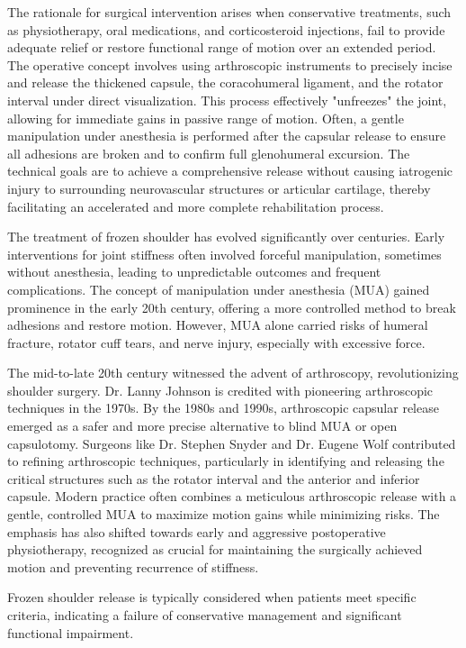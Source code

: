 The rationale for surgical intervention arises when conservative treatments, such as physiotherapy, oral medications, and corticosteroid injections, fail to provide adequate relief or restore functional range of motion over an extended period. The operative concept involves using arthroscopic instruments to precisely incise and release the thickened capsule, the coracohumeral ligament, and the rotator interval under direct visualization. This process effectively "unfreezes" the joint, allowing for immediate gains in passive range of motion. Often, a gentle manipulation under anesthesia is performed after the capsular release to ensure all adhesions are broken and to confirm full glenohumeral excursion. The technical goals are to achieve a comprehensive release without causing iatrogenic injury to surrounding neurovascular structures or articular cartilage, thereby facilitating an accelerated and more complete rehabilitation process.

The treatment of frozen shoulder has evolved significantly over centuries. Early interventions for joint stiffness often involved forceful manipulation, sometimes without anesthesia, leading to unpredictable outcomes and frequent complications. The concept of manipulation under anesthesia (MUA) gained prominence in the early 20th century, offering a more controlled method to break adhesions and restore motion. However, MUA alone carried risks of humeral fracture, rotator cuff tears, and nerve injury, especially with excessive force.

The mid-to-late 20th century witnessed the advent of arthroscopy, revolutionizing shoulder surgery. Dr. Lanny Johnson is credited with pioneering arthroscopic techniques in the 1970s. By the 1980s and 1990s, arthroscopic capsular release emerged as a safer and more precise alternative to blind MUA or open capsulotomy. Surgeons like Dr. Stephen Snyder and Dr. Eugene Wolf contributed to refining arthroscopic techniques, particularly in identifying and releasing the critical structures such as the rotator interval and the anterior and inferior capsule. Modern practice often combines a meticulous arthroscopic release with a gentle, controlled MUA to maximize motion gains while minimizing risks. The emphasis has also shifted towards early and aggressive postoperative physiotherapy, recognized as crucial for maintaining the surgically achieved motion and preventing recurrence of stiffness.

Frozen shoulder release is typically considered when patients meet specific criteria, indicating a failure of conservative management and significant functional impairment.

